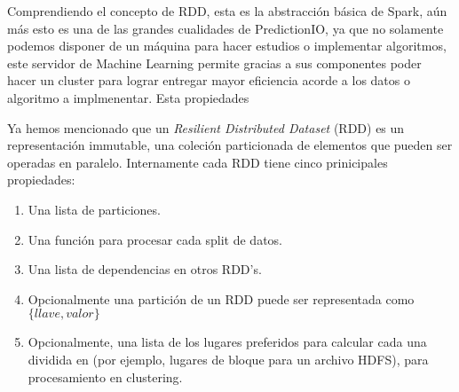 

  Comprendiendo el concepto de RDD, esta es la abstracción básica de Spark, aún más esto es una de las grandes cualidades de PredictionIO, ya que no solamente podemos disponer de un máquina para hacer estudios o implementar algoritmos, este servidor de Machine Learning permite gracias a sus componentes poder hacer un cluster para lograr entregar mayor eficiencia acorde a los datos o algoritmo a implmenentar.  Esta propiedades

  Ya hemos mencionado que un \emph{Resilient Distributed Dataset} (RDD) es un representación immutable, una coleción particionada de elementos que pueden ser operadas en paralelo. Internamente cada RDD tiene cinco prinicipales propiedades:


  \begin{enumerate}
    \item Una lista de particiones.
    \item Una función para procesar cada split de datos.
    \item Una lista de dependencias en otros RDD's. 
    \item Opcionalmente una partición de un RDD puede ser representada como $\{llave,valor\}$ 

    \item Opcionalmente, una lista de los lugares preferidos para calcular cada una dividida en (por ejemplo, lugares de bloque para un archivo HDFS), para procesamiento en clustering.

  \end{enumerate}





















